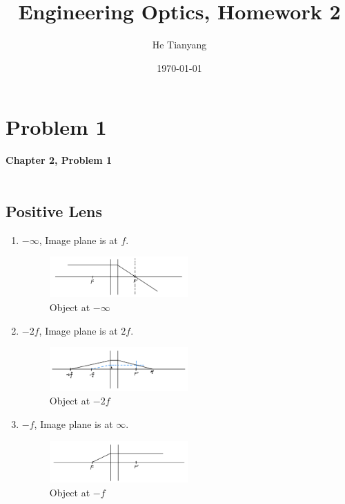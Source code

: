 \documentclass{article}
\title{Engineering Optics, Homework 2}
\author{He Tianyang}
\date{\today}
\begin{document}
\maketitle

\section{Problem 1}
\textbf{Chapter 2, Problem 1}\\\\

\subsection{Positive Lens}

\begin{enumerate}
    \item $-\infty$, Image plane is at $f$.
          \begin{figure}[H]
              \centering
              \includegraphics[width=0.5\textwidth]{image/hw2/hw2_1_1.jpeg}
              \caption{Object at $-\infty$}
          \end{figure}
    \item $-2f$, Image plane is at $2f$.
          \begin{figure}[H]
              \centering
              \includegraphics[width=0.5\textwidth]{image/hw2/hw2_1_2.jpeg}
              \caption{Object at $-2f$}
          \end{figure}
    \item $-f$, Image plane is at $\infty$.
          \begin{figure}[H]
              \centering
              \includegraphics[width=0.5\textwidth]{image/hw2/hw2_1_3.jpeg}
              \caption{Object at $-f$}
          \end{figure}

\end{enumerate}
\end{document}
